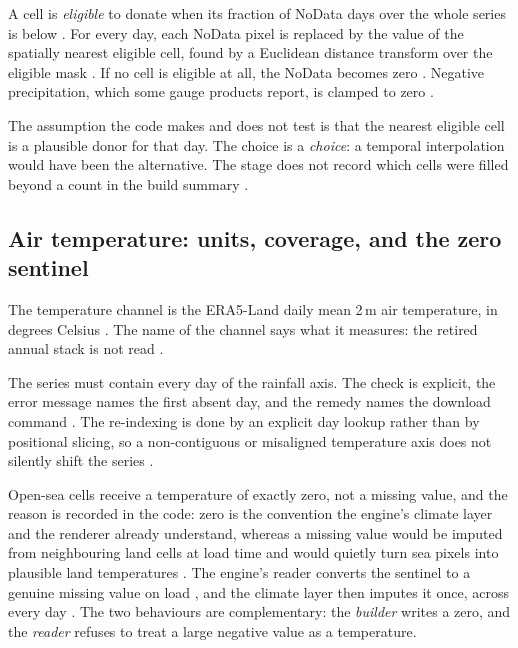 \documentclass[11pt,a4paper]{article} \usepackage[utf8]{inputenc} \usepackage{lmodern} \usepackage[T1]{fontenc}
\begin{document}
A cell is \emph{eligible} to donate when its fraction of NoData days over the whole series is
below 
. For every day, each NoData pixel is
replaced by the value of the spatially nearest eligible cell, found by a Euclidean distance
transform over the eligible mask . If
no cell is eligible at all, the NoData becomes zero
. Negative precipitation, which some
gauge products report, is clamped to zero .

The assumption the code makes and does not test is that the nearest eligible cell is a plausible
donor for that day. The choice is a \emph{choice}: a temporal interpolation would have been the
alternative. The stage does not record which cells were filled beyond a count in the build
summary .

\subsection{Air temperature: units, coverage, and the zero sentinel}

The temperature channel is the ERA5-Land daily mean 2\,m air temperature, in degrees Celsius
. The name of the channel says what it
measures: the retired annual  stack is not read
.

The series must contain every day of the rainfall axis. The check is explicit, the error message
names the first absent day, and the remedy names the download command
. The re-indexing is done by an
explicit day lookup rather than by positional slicing, so a non-contiguous or misaligned
temperature axis does not silently shift the series
.

Open-sea cells receive a temperature of exactly zero, not a missing value, and the reason is
recorded in the code: zero is the convention the engine's climate layer and the renderer already
understand, whereas a missing value would be imputed from neighbouring land cells at load time
and would quietly turn sea pixels into plausible land temperatures
. The engine's reader converts the
sentinel to a genuine missing value on load
, and the climate layer then
imputes it once, across every day . The
two behaviours are complementary: the \emph{builder} writes a zero, and the \emph{reader}
refuses to treat a large negative value as a temperature.
\end{document}
